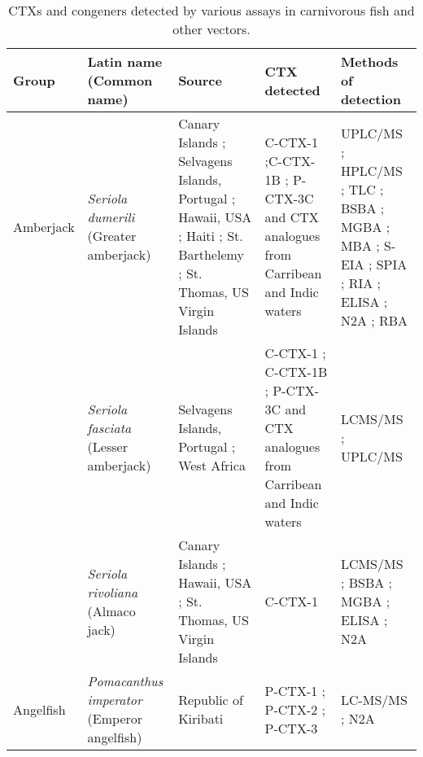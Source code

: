 \documentclass[12pt]{article}
\begin{document}
	\begin{longtable}{ | p{2cm} | p{3cm} | p{4.5cm} | p{2cm} | p{3cm} | }
	\caption{CTXs and congeners detected by various assays in carnivorous fish and other vectors.}\\
	\label{tbl:CarnTable}
	\textbf{Group} & \textbf{Latin name} (Common name) & \textbf{Source} & \textbf{CTX detected} & \textbf{Methods of detection} \\
	\hline
	Amberjack & \emph{Seriola dumerili} (Greater amberjack) & Canary Islands \cite{caillaud2012towards}; Selvagens Islands, Portugal \cite{otero2010first}; Hawaii, USA \cite{campora2008detection,hokama1977radioimmunoassay,hokama1983rapid,hokama1993evaluation}; Haiti \cite{poli1997identification}; St. Barthelemy \cite{vernoux1986heterogeneity}; St. Thomas, US Virgin Islands \cite{granade1976ciguatera} & C-CTX-1 \cite{poli1997identification};C-CTX-1B \cite{otero2010first}; P-CTX-3C and CTX analogues from Carribean and Indic waters \cite{otero2010first} & UPLC/MS \cite{otero2010first}; HPLC/MS \cite{poli1997identification}; TLC \cite{vernoux1986heterogeneity}; BSBA \cite{granade1976ciguatera}; MGBA \cite{campora2008detection,granade1976ciguatera}; MBA \cite{hokama1983rapid,hokama1993evaluation,vernoux1986heterogeneity}; S-EIA \cite{hokama1993evaluation}; SPIA \cite{otero2010first}; RIA \cite{campora2008detection,hokama1983rapid}; ELISA \cite{campora2008detection}; N2A \cite{caillaud2012towards,campora2008detection}; RBA \cite{} \\
	& \emph{Seriola fasciata} (Lesser amberjack) & Selvagens Islands, Portugal \cite{otero2010first}; West Africa \cite{boada2010ciguatera} & C-CTX-1 \cite{boada2010ciguatera}; C-CTX-1B \cite{otero2010first}; P-CTX-3C and CTX analogues from Carribean and Indic waters \cite{otero2010first} & LCMS/MS \cite{boada2010ciguatera}; UPLC/MS \cite{otero2010first}\\
	& \emph{Seriola rivoliana} (Almaco jack) & Canary Islands \cite{campora2010evaluating}; Hawaii, USA \cite{campora2008detection}; St. Thomas, US Virgin Islands \cite{granade1976ciguatera} & C-CTX-1 \cite{} & LCMS/MS \cite{}; BSBA \cite{granade1976ciguatera}; MGBA \cite{granade1976ciguatera}; ELISA \cite{campora2008detection,campora2010evaluating}; N2A \cite{campora2008detection,campora2010evaluating} \\
	\hline
	Angelfish  & \emph{Pomacanthus imperator} (Emperor angelfish) & Republic of Kiribati \cite{mak2013pacific} & P-CTX-1 \cite{mak2013pacific}; P-CTX-2 \cite{mak2013pacific}; P-CTX-3 \cite{mak2013pacific} & LC-MS/MS \cite{mak2013pacific}; N2A \cite{mak2013pacific} \\

\end{longtable}
\end{document}
